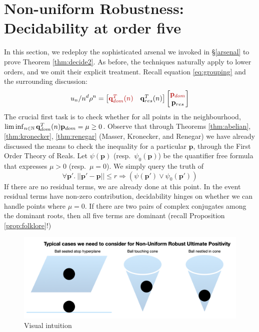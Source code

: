 \section{Non-uniform Robustness: Decidability at order five}
\label{section:decidability2}
In this section, we redeploy the sophisticated arsenal we invoked in \S\ref{arsenal} to prove Theorem \ref{thm:decide2}. As before, the techniques naturally apply to lower orders, and we omit their explicit treatment. Recall equation \ref{eq:grouping} and the surrounding discussion:
\begin{equation}
u_n/n^d\rho^n = \begin{bmatrix}
{\color{red!70!black} \mathbf{q}_{dom}^T(n) } & \mathbf{q}_{res}^T(n)
\end{bmatrix}
\begin{bmatrix}
{\color{red!70!black} \mathbf{p}_{dom}} \\
\mathbf{p}_{res}
\end{bmatrix}
\end{equation}
The crucial first task is to check whether for all points in the neighbourhood, \\$\liminf_{n\in\mathbb{N}}\mathbf{q}_{dom}^T(n)\mathbf{p}_{dom} = \mu \ge 0$. Observe that through Theorems \ref{thm:abelian}, \ref{thm:kronecker}, \ref{thm:renegar} (Masser, Kronecker, and Renegar) we have already discussed the means to check the inequality for a particular $\mathbf{p}$, through the First Order Theory of Reals. Let $\psi(\mathbf{p})$ (resp.\ $\psi_0(\mathbf{p})$) be the quantifier free formula that expresses $\mu > 0$ (resp.\ $\mu = 0$). We simply query the truth of
\begin{equation}
\label{eq:firsttask}
\forall \mathbf{p'}.~||\mathbf{p'} - \mathbf{p}|| \le r \Rightarrow (\psi(\mathbf{p'}) \lor \psi_0(\mathbf{p'}))
\end{equation}
If there are no residual terms, we are already done at this point. In the event residual terms have non-zero contribution, decidability hinges on whether we can handle points where $\mu = 0$. If there are two pairs of complex conjugates among the dominant roots, then all five terms are dominant (recall Proposition \ref{prop:folklore}!)

\begin{figure}[h]

\includegraphics[width=\textwidth]{picture1.png}
\caption{Visual intuition}
\label{fig:geometricpicture}
\end{figure}

